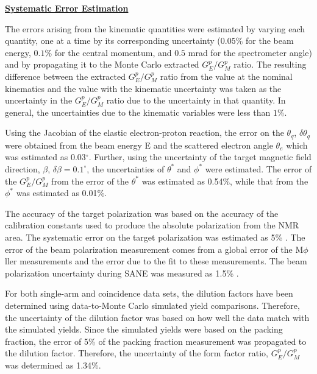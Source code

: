 \documentclass[12pt]{article}
\begin{document}
\vspace{8 mm}

{
\raggedleft
\underline{\textbf{Systematic Error Estimation}}
}

The errors arising from the kinematic quantities were estimated by varying each quantity, one at a time by its corresponding uncertainty ($0.05$$\%$ for the beam energy, $0.1$$\%$ for the central momentum, and $0.5$ mrad for the spectrometer angle) and by propagating it to the Monte Carlo extracted $G_E^p/G_M^p$ ratio. The resulting difference between the extracted $G_E^p/G_M^p$ ratio from the value at the nominal kinematics and the value with the kinematic uncertainty was taken as the uncertainty in the $G_E^p/G_M^p$ ratio due to the uncertainty in that quantity. In general, the uncertainties due to the kinematic variables were less than $1$$\%$. 

Using the Jacobian of the elastic electron-proton reaction, the error on the  $ \theta_q$, $\delta \theta_q$ were obtained from the beam energy E and the scattered electron angle $\theta_e$ which was estimated as 0.03$^{\circ}$. Further, using the uncertainty of the target magnetic field direction, $\beta$, $\delta \beta=0.1^{\circ}$, the uncertainties of  $\theta^*$ and $\phi ^*$ were estimated. The error of the $G_E^p/G_M^p$ from the error of the $\theta^*$ was estimated as 0.54\%, while that from the $\phi ^*$ was estimated as 0.01\%.

The accuracy of the target polarization was based on the accuracy of the calibration constants used to produce the absolute polarization from the NMR area. The systematic error on the target polarization was estimated as 5\% \cite{109}. The error of the beam polarization measurement comes from a global error of the M$\phi$ller measurements and the error due to the fit to these measurements. The beam polarization uncertainty during SANE was measured as 1.5\% \cite{109}.

For both single-arm and coincidence data sets, the dilution factors have been determined using data-to-Monte Carlo simulated yield comparisons. Therefore, the uncertainty of the dilution factor was based on how well the data match with the simulated yields. Since the simulated yields were based on the packing fraction, the error of 5\% of the packing fraction measurement was propagated to the dilution factor. Therefore, the uncertainty of the form factor ratio, $G_E^p/G_M^p$ was determined as 1.34\%.
\end{document}
